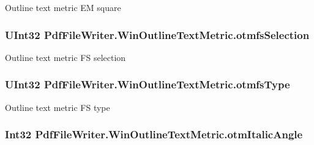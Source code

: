 Outline text metric EM square 

\subsubsection[{\texorpdfstring{otmfs\+Selection}{otmfsSelection}}]{\setlength{\rightskip}{0pt plus 5cm}U\+Int32 Pdf\+File\+Writer.\+Win\+Outline\+Text\+Metric.\+otmfs\+Selection\hspace{0.3cm}{\ttfamily [get]}}\hypertarget{class_pdf_file_writer_1_1_win_outline_text_metric_abbbbcfadfaa50e7c23fea1915389ed59}{}\label{class_pdf_file_writer_1_1_win_outline_text_metric_abbbbcfadfaa50e7c23fea1915389ed59}


Outline text metric FS selection 

\subsubsection[{\texorpdfstring{otmfs\+Type}{otmfsType}}]{\setlength{\rightskip}{0pt plus 5cm}U\+Int32 Pdf\+File\+Writer.\+Win\+Outline\+Text\+Metric.\+otmfs\+Type\hspace{0.3cm}{\ttfamily [get]}}\hypertarget{class_pdf_file_writer_1_1_win_outline_text_metric_a3d3c57160f70e4b3155f1d4f8d441e43}{}\label{class_pdf_file_writer_1_1_win_outline_text_metric_a3d3c57160f70e4b3155f1d4f8d441e43}


Outline text metric FS type 

\subsubsection[{\texorpdfstring{otm\+Italic\+Angle}{otmItalicAngle}}]{\setlength{\rightskip}{0pt plus 5cm}Int32 Pdf\+File\+Writer.\+Win\+Outline\+Text\+Metric.\+otm\+Italic\+Angle\hspace{0.3cm}{\ttfamily [get]}}\hypertarget{class_pdf_file_writer_1_1_win_outline_text_metric_ac5a72a736b130a724ceec5af05b96e97}{}\label{class_pdf_file_writer_1_1_win_outline_text_metric_ac5a72a736b130a724ceec5af05b96e97}


